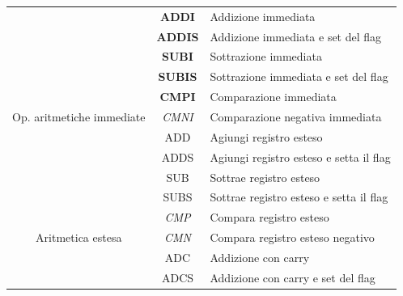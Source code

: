 \documentclass[12pt,a4paper]{article}
\begin{document}
\begin{longtable}{|c|c|l|}
                                                           & \textbf{ADDI}         & Addizione immediata                                \\ \cline{2-3} 
                                                           & \textbf{ADDIS}        & Addizione immediata e set del flag                 \\ \cline{2-3} 
                                                           & \textbf{SUBI}         & Sottrazione immediata                              \\ \cline{2-3} 
                                                           & \textbf{SUBIS}        & Sottrazione immediata e set del flag               \\ \cline{2-3} 
                                                           & \textbf{CMPI}         & Comparazione immediata                             \\ \cline{2-3} 
\multirow{-6}{*}{Op. aritmetiche immediate}         & \textit{CMNI}         & Comparazione negativa immediata                    \\ \hline
                                                           & ADD                   & Agiungi registro esteso                            \\ \cline{2-3} 
                                                           & ADDS                  & Agiungi registro esteso e setta il flag            \\ \cline{2-3} 
                                                           & SUB                   & Sottrae registro esteso                            \\ \cline{2-3} 
                                                           & SUBS                  & Sottrae registro esteso e setta il flag            \\ \cline{2-3} 
                                                           & \textit{CMP}          & Compara registro esteso                            \\ \cline{2-3} 
\multirow{-6}{*}{Aritmetica estesa}                        & \textit{CMN}          & Compara registro esteso negativo                   \\ \hline
                                                           & ADC                   & Addizione con carry                                \\ \cline{2-3} 
                                                           & ADCS                  & Addizione con carry e set del flag                 \\ \cline{2-3} 

\end{longtable}
\end{document}
